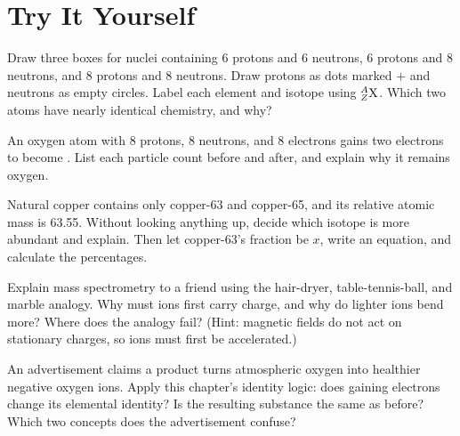 \section*{Try It Yourself}

\begin{sikaoti}
\item Draw three boxes for nuclei containing 6 protons and 6 neutrons, 6 protons and 8 neutrons, and 8 protons and 8 neutrons. Draw protons as dots marked $+$ and neutrons as empty circles. Label each element and isotope using ${}^{A}_{Z}\mathrm{X}$. Which two atoms have nearly identical chemistry, and why?
\item An oxygen atom with 8 protons, 8 neutrons, and 8 electrons gains two electrons to become . List each particle count before and after, and explain why it remains oxygen.
\item Natural copper contains only copper-63 and copper-65, and its relative atomic mass is 63.55. Without looking anything up, decide which isotope is more abundant and explain. Then let copper-63's fraction be $x$, write an equation, and calculate the percentages.
\item Explain mass spectrometry to a friend using the hair-dryer, table-tennis-ball, and marble analogy. Why must ions first carry charge, and why do lighter ions bend more? Where does the analogy fail? (Hint: magnetic fields do not act on stationary charges, so ions must first be accelerated.)
\item An advertisement claims a product turns atmospheric oxygen into healthier negative oxygen ions. Apply this chapter's identity logic: does  gaining electrons change its elemental identity? Is the resulting substance the same as before? Which two concepts does the advertisement confuse?
\end{sikaoti}

